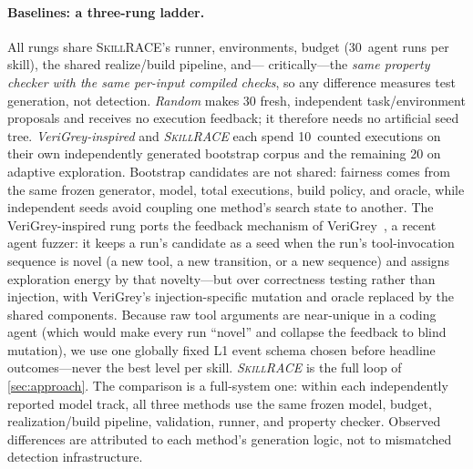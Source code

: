 \documentclass[acmsmall,screen,review,anonymous]{acmart}
\newcommand{\tool}{\textsc{SkillRACE}\xspace}
\newcommand{\Budget}{30}                     %
\newcommand{\SeedCount}{10}                  %
\begin{document}
\paragraph{Baselines: a three-rung ladder.} All rungs share \tool's runner, environments,
budget (\Budget\ agent runs per skill), the shared realize/build pipeline, and---%
critically---the \emph{same property checker with the same per-input compiled checks}, so
any difference measures test generation, not detection. \emph{Random} makes \Budget
fresh, independent task/environment proposals and receives no execution feedback; it
therefore needs no artificial seed tree. \emph{VeriGrey-inspired} and \emph{\tool}
each spend \SeedCount\ counted executions on their own independently generated bootstrap
corpus and the remaining 20 on adaptive exploration. Bootstrap candidates are not shared:
fairness comes from the same frozen generator, model, total executions, build policy, and
oracle, while independent seeds avoid coupling one method's search state to another.
The VeriGrey-inspired rung ports the feedback mechanism of VeriGrey~\cite{verigrey}, a recent
agent fuzzer: it keeps a run's candidate as a seed when the run's tool-invocation sequence is
novel (a new tool, a new transition, or a new sequence) and assigns exploration energy
by that novelty---but over correctness testing rather than injection, with VeriGrey's
injection-specific mutation and oracle replaced by the shared components. Because raw
tool arguments are near-unique in a coding agent (which would make every run ``novel''
and collapse the feedback to blind mutation), we use one globally fixed L1 event schema
chosen before headline outcomes---never the best level per skill. \emph{\tool} is the full
loop of \cref{sec:approach}. The comparison is a full-system one: within each
independently reported model track, all three methods use the same frozen model, budget,
realization/build pipeline, validation, runner, and property checker.
Observed differences are attributed to each method's generation logic, not to mismatched
detection infrastructure.
\end{document}
